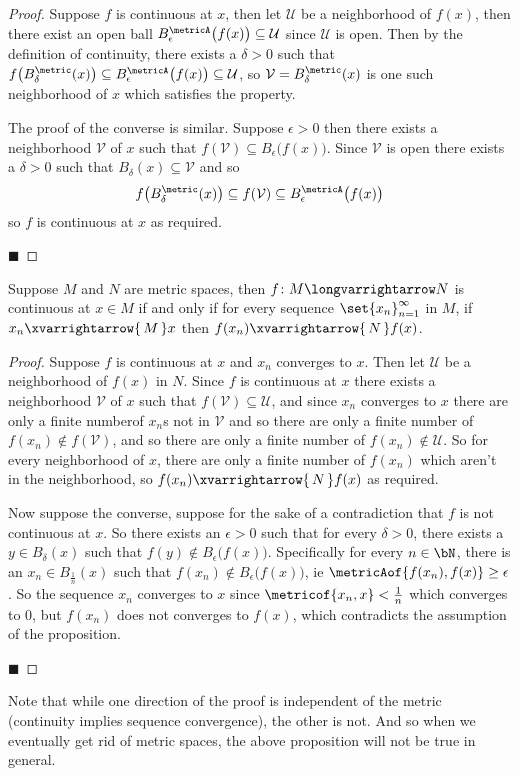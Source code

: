 \documentclass[10pt]{article}
\def\mU{\mathcal{U}}
\def\mV{\mathcal{V}}
\begin{document}
\begin{proof}

    Suppose $f$ is continuous at $x$, then let $\mU$ be a neighborhood of $f(x)$, then there exist an open ball $B_\epsilon^{\metricA}\bigl(f(x)\bigr)\subseteq\mU$ since $\mU$ is open.
    Then by the definition of continuity, there exists a $\delta>0$ such that $f\bigl(B_\delta^{\metric}(x)\bigr)\subseteq B_\epsilon^{\metricA}\bigl(f(x)\bigr)\subseteq\mU$, so $\mV=B_\delta^{\metric}(x)$
    is one such neighborhood of $x$ which satisfies the property.

    The proof of the converse is similar.
    Suppose $\epsilon>0$ then there exists a neighborhood $\mV$ of $x$ such that $f(\mV)\subseteq B_\epsilon\bigl(f(x)\bigr)$.
    Since $\mV$ is open there exists a $\delta>0$ such that $B_\delta(x)\subseteq\mV$ and so
    \[ f\bigl(B_\delta^{\metric}(x)\bigr)\subseteq f(\mV)\subseteq B_\epsilon^{\metricA}\bigl(f(x)\bigr) \]
    so $f$ is continuous at $x$ as required.

    \hfill$\blacksquare$

\end{proof}

\begin{prop*}

    Suppose $M$ and $N$ are metric spaces, then $f\colon M\longvarrightarrow N$ is continuous at $x\in M$ if and only if for every sequence $\set{x_n}_{n=1}^\infty$ in $M$, if $x_n\xvarrightarrow{\,M\,}x$
    then $f(x_n)\xvarrightarrow{\,N\,}f(x)$.

\end{prop*}

\begin{proof}

    Suppose $f$ is continuous at $x$ and $x_n$ converges to $x$.
    Then let $\mU$ be a neighborhood of $f(x)$ in $N$.
    Since $f$ is continuous at $x$ there exists a neighborhood $\mV$ of $x$ such that $f(\mV)\subseteq\mU$, and since $x_n$ converges to $x$ there are only a finite numberof $x_n$s not in $\mV$ and so there 
    are only a finite number of $f(x_n)\notin f(\mV)$, and so there are only a finite number of $f(x_n)\notin\mU$.
    So for every neighborhood of $x$, there are only a finite number of $f(x_n)$ which aren't in the neighborhood, so $f(x_n)\xvarrightarrow{\,N\,}f(x)$ as required.

    Now suppose the converse, suppose for the sake of a contradiction that $f$ is not continuous at $x$.
    So there exists an $\epsilon>0$ such that for every $\delta>0$, there exists a $y\in B_\delta(x)$ such that $f(y)\notin B_\epsilon\bigl(f(x)\bigr)$.
    Specifically for every $n\in\bN$, there is an $x_n\in B_{\frac1n}(x)$ such that $f(x_n)\notin B_\epsilon\bigl(f(x)\bigr)$, ie $\metricAof{f(x_n),f(x)}\geq\epsilon$.
    So the sequence $x_n$ converges to $x$ since $\metricof{x_n,x}<\frac1n$ which converges to $0$, but $f(x_n)$ does not converges to $f(x)$, which contradicts the assumption of the proposition.

    \hfill$\blacksquare$

\end{proof}

Note that while one direction of the proof is independent of the metric (continuity implies sequence convergence), the other is not.
And so when we eventually get rid of metric spaces, the above proposition will not be true in general.
\end{document}

